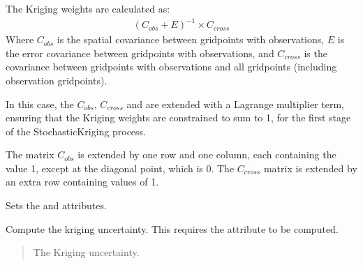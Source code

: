\documentclass[letterpaper,10pt,english]{sphinxmanual}
\begin{document}
\begin{fulllineitems}
\begin{fulllineitems}
\sphinxAtStartPar
The Kriging weights are calculated as:
\begin{equation*}
\begin{split}(C_{obs} + E)^{-1} \times C_{cross}\end{split}
\end{equation*}
\sphinxAtStartPar
Where \(C_{obs}\) is the spatial covariance between grid\sphinxhyphen{}points
with observations, \(E\) is the error covariance between grid\sphinxhyphen{}points
with observations, and \(C_{cross}\) is the covariance between
grid\sphinxhyphen{}points with observations and all grid\sphinxhyphen{}points (including observation
grid\sphinxhyphen{}points).

\sphinxAtStartPar
In this case, the \(C_{obs}\), \(C_{cross}\) and are extended
with a Lagrange multiplier term, ensuring that the Kriging weights are
constrained to sum to 1, for the first stage of the StochasticKriging
process.

\sphinxAtStartPar
The matrix \(C_{obs}\) is extended by one row and one column, each
containing the value 1, except at the diagonal point, which is 0. The
\(C_{cross}\) matrix is extended by an extra row containing values
of 1.

\sphinxAtStartPar
Sets the  and  attributes.
\begin{quote}\begin{description}
\sphinxAtStartPar
{}

\end{description}\end{quote}

\end{fulllineitems}


\begin{fulllineitems}
\label{\detokenize{kriging:glomar_gridding.stochastic.StochasticKriging.get_uncertainty}}
\pysigstartsignatures
\pysiglinewithargsret
{}
{}
{}
\pysigstopsignatures
\sphinxAtStartPar
Compute the kriging uncertainty. This requires the attribute
 to be computed.
\begin{quote}\begin{description}
\sphinxAtStartPar
{} \textendash{} The Kriging uncertainty.


\end{description}
\end{quote}
\end{fulllineitems}
\end{fulllineitems}
\end{document}

